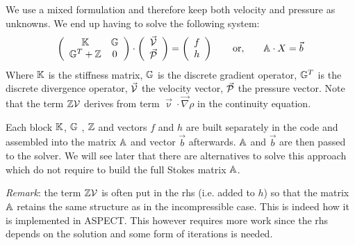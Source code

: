 We use a mixed formulation and therefore keep both velocity and pressure as unknowns. 
We end up having to solve the following system:
\[
\left(
\begin{array}{cc}
{\mathbb{K}} & {\mathbb{G}} \\ {\mathbb{G}}^T+{\mathbb{Z}} & 0 
\end{array}
\right)
\cdot
\left(
\begin{array}{c}
\vec{\cal V} \\ \vec{\cal P}
\end{array}
\right)
=
\left(
\begin{array}{c}
 f \\ h
\end{array}
\right)
\quad\quad
{\rm or,}
\quad\quad
{\mathbb{A}} \cdot X = \vec{b}
\]
Where ${\mathbb{K}}$ is the stiffness matrix, ${\mathbb{G}}$ is the discrete gradient operator, 
${\mathbb{G}}^T$ is the discrete divergence operator, $\vec{\cal V}$ the velocity vector, 
$\vec{\cal P}$ the pressure vector.
Note that the term ${\mathbb{Z}}{\cal V}$ derives from term $\vec{\upnu} \cdot \vec{\nabla}\rho$ 
in the continuity equation. 

Each block ${\mathbb{K}}$, ${\mathbb{G}}$ , ${\mathbb{Z}}$ and vectors $f$ and $h$ are built separately 
in the code and assembled into the matrix ${\mathbb{A}}$ and vector $\vec{b}$ 
afterwards. ${\mathbb{A}}$ and $\vec{b}$ are then passed to the solver. 
We will see later that there are alternatives to solve this approach which do not require to 
build the full Stokes matrix ${\mathbb{A}}$. 

{\sl Remark}: the term ${\mathbb{Z}} {\cal V}$ is often put in the rhs (i.e. added to $h$) so that 
the matrix ${\mathbb{A}}$ retains the same structure as in the incompressible case. This is indeed 
how it is implemented in ASPECT. This however requires more work since the rhs depends 
on the solution and some form of iterations is needed. 

